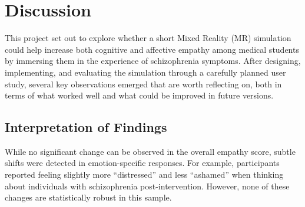 \chapter{Discussion}
\label{ch:discussion}

This project set out to explore whether a short Mixed Reality (MR) simulation could help increase both cognitive and affective empathy among medical students by immersing them in the experience of schizophrenia symptoms. After designing, implementing, and evaluating the simulation through a carefully planned user study, several key observations emerged that are worth reflecting on, both in terms of what worked well and what could be improved in future versions.

\section{Interpretation of Findings}

While no significant change can be observed in the overall empathy score, subtle shifts were detected in emotion-specific responses. For example, participants reported feeling slightly more “distressed” and less “ashamed” when thinking about individuals with schizophrenia post-intervention. However, none of these changes are statistically robust in this sample.

